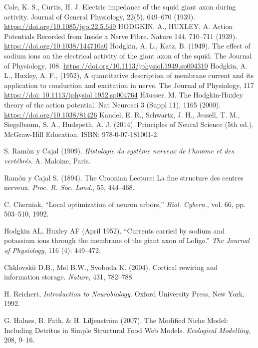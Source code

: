 \documentclass[12pt,a4paper]{report}
\begin{document}
\begin{thebibliography}{9}
     Cole, K. S., Curtis, H. J. Electric impedance of the squid giant axon during activity. Journal of General Physiology, 22(5), 649–670 (1939). 
    \url{https://doi.org/10.1085/jgp.22.5.649}
    HODGKIN, A., HUXLEY, A. Action Potentials Recorded from Inside a Nerve Fibre. Nature 144, 710–711 (1939).
    \url{https://doi.org/10.1038/144710a0}
     Hodgkin, A. L., Katz, B. (1949). The effect of sodium ions on the electrical activity of the giant axon of the squid. The Journal of Physiology, 108. 
    \url{https://doi.org/10.1113/jphysiol.1949.sp004310}
     Hodgkin, A. L., Huxley, A. F., (1952), A quantitative description of membrane current and its application to conduction and excitation in nerve. The Journal of Physiology, 117 
    \url{https://doi: 10.1113/jphysiol.1952.sp004764}
     Häusser, M. The Hodgkin-Huxley theory of the action potential. Nat Neurosci 3 (Suppl 11), 1165 (2000). \url{https://doi.org/10.1038/81426}
    Kandel, E. R., Schwartz, J. H., Jessell, T. M., Siegelbaum, S. A., Hudspeth, A. J. (2014). Principles of Neural Science (5th ed.). McGraw-Hill Education. ISBN: 978-0-07-181001-2.


    S. Ramòn y Cajal (1909). \textit{Histologie du système nerveux de l’homme et des vertébrés}. A. Maloine, Paris.


    Ramón y Cajal S. (1894). The Croonian Lecture: La fine structure des centres nerveux. \textit{Proc. R. Soc. Lond.}, 55, 444--468.


    C. Cherniak, ``Local optimization of neuron arbors,'' \textit{Biol. Cybern.}, vol. 66, pp. 503--510, 1992.



    Hodgkin AL, Huxley AF (April 1952). ``Currents carried by sodium and potassium ions through the membrane of the giant axon of Loligo.'' \textit{The Journal of Physiology}, 116 (4): 449–472. 



    Chklovskii D.B., Mel B.W., Svoboda K. (2004). Cortical rewiring and information storage. \textit{Nature}, 431, 782--788.


    H. Reichert, \textit{Introduction to Neurobiology}. Oxford University Press, New York, 1992.


    G. Halnes, B. Fath, \& H. Liljenström (2007). The Modified Niche Model: Including Detritus in Simple Structural Food Web Models. \textit{Ecological Modelling}, 208, 9--16.


\end{thebibliography}
\end{document}
